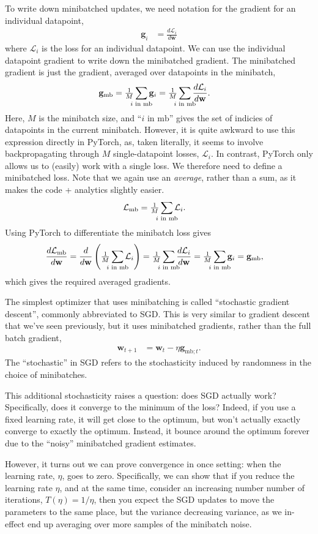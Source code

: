\documentclass{article}
\newcommand{\dt}[2][]{\frac{d #1}{d #2}}
\newcommand{\dLi}{\dt[{\Li}]}
\newcommand{\dLmb}{\dt[{\Lmb}]}
\newcommand{\bracket}[3]{\left#1 #3 \right#2}
\renewcommand{\b}{\bracket{(}{)}}
\newcommand{\0}{\mathbf{0}}
\newcommand{\g}{\mathbf{g}}
\newcommand{\gmb}{\g_\text{mb}}
\newcommand{\gmbt}{\g_{\text{mb}; t}}
\newcommand{\w}{\mathbf{w}}
\renewcommand{\L}{\mathcal{L}}
\newcommand{\Li}{\L_i}
\newcommand{\Lmb}{\L_\text{mb}}
\newcommand{\iinmb}{{i \text{ in mb}}}
\newcommand{\mbsize}{M}
\newcommand{\mbavg}{\tfrac{1}{\mbsize} \sum_{\mathclap{\iinmb}}}
\begin{document}
To write down minibatched updates, we need notation for the gradient for an individual datapoint,
\begin{align}
  \g_i &= \dLi{\w}
\end{align}
where $\Li$ is the loss for an individual datapoint.
We can use the individual datapoint gradient to write down the minibatched gradient. 
The minibatched gradient is just the gradient, averaged over datapoints in the minibatch,
\begin{align}
  \gmb &= \mbavg \g_i =  \mbavg \dLi{\w}.
\end{align}
Here, $\mbsize$ is the minibatch size, and ``$\iinmb$'' gives the set of indicies of datapoints in the current minibatch.
However, it is quite awkward to use this expression directly in PyTorch, as, taken literally, it seems to involve backpropagating through $M$ single-datapoint losses, $\Li$.
In contrast, PyTorch only allows us to (easily) work with a single loss.
We therefore need to define a minibatched loss.
Note that we again use an \textit{average}, rather than a sum, as it makes the code + analytics slightly easier.
\begin{align}
  \Lmb &= \mbavg \L_i.
\end{align}
Using PyTorch to differentiate the minibatch loss gives 
\begin{align}
  \dLmb{\w} &= \dt{\w} \b{\mbavg \L_i} = \mbavg \dLi{\w} = \mbavg \g_i = \gmb,
\end{align}
which gives the required averaged gradients.

The simplest optimizer that uses minibatching is called ``stochastic gradient descent'', commonly abbreviated to SGD.
This is very similar to gradient descent that we've seen previously, but it uses minibatched gradients, rather than the full batch gradient,
\begin{align}
  \w_{t+1} &= \w_t - \eta \gmbt.
\end{align}
The ``stochastic'' in SGD refers to the stochasticity induced by randomness in the choice of minibatches.

This additional stochasticity raises a question: does SGD actually work?
Specifically, does it converge to the minimum of the loss?
Indeed, if you use a fixed learning rate, it will get close to the optimum, but won't actually exactly converge to exactly the optimum. 
Instead, it bounce around the optimum forever due to the ``noisy'' minibatched gradient estimates.

However, it turns out we can prove convergence in once setting: when the learning rate, $\eta$, goes to zero.
Specifically, we can show that if you reduce the learning rate $\eta$, and at the same time, consider an increasing number number of iterations, $T(\eta) = 1/\eta$, then you expect the SGD updates to move the parameters to the same place, but the variance decreasing variance, as we in-effect end up averaging over more samples of the minibatch noise.
\end{document}
